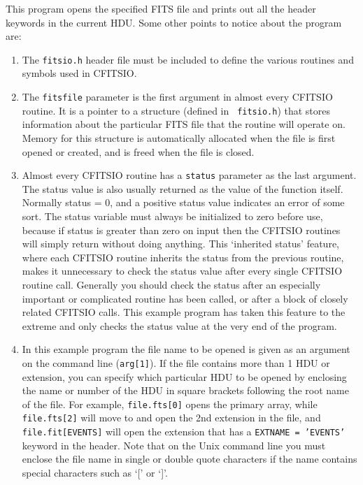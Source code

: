 \documentclass[11pt]{article}
\begin{document}
This program opens the specified FITS file and prints
out all the header keywords in the current HDU.
Some other points to notice about the program are:
\begin{enumerate}

\item
The {\tt fitsio.h} header file must be included to define the 
various routines and symbols used in CFITSIO.

\item

The {\tt fitsfile}  parameter is the first argument in almost every
CFITSIO routine.  It is a pointer to a structure (defined in {\tt
fitsio.h}) that stores information about the particular FITS file that
the routine will operate on.  Memory for this structure is
automatically allocated when the file is first opened or created, and
is freed when the file is closed.

\item
Almost every CFITSIO routine has a {\tt status} parameter as the last
argument. The status value is also usually returned as the value of the
function itself.  Normally status = 0, and a positive status value
indicates an error of some sort.  The status variable must always be
initialized to zero before use, because if status is greater than zero
on input then the CFITSIO routines will simply return without doing
anything.  This `inherited status' feature, where each CFITSIO routine
inherits the status from the previous routine, makes it unnecessary to
check the status value after every single CFITSIO routine call.
Generally you should check the status after an especially important or
complicated routine has been called, or after a block of
closely related CFITSIO calls.  This example program has taken this
feature to the extreme and only checks the status value at the 
very end of the program.

\item

In this example program the file name to be opened is given as an
argument on the command line ({\tt arg[1]}).  If the file contains more
than 1 HDU or extension, you can specify which particular HDU to be
opened by enclosing the name or number of the HDU in square brackets
following the root name of the file.  For example, {\tt file.fts[0]}
opens the  primary array, while {\tt file.fts[2]} will move to and open
the 2nd extension in the file, and {\tt file.fit[EVENTS]} will open the
extension that has a {\tt EXTNAME = 'EVENTS'} keyword in the header.
Note that on the Unix command line you must enclose the file name in
single or double quote characters if the name contains special
characters such as `[' or `]'.


\end{enumerate}
\end{document}
